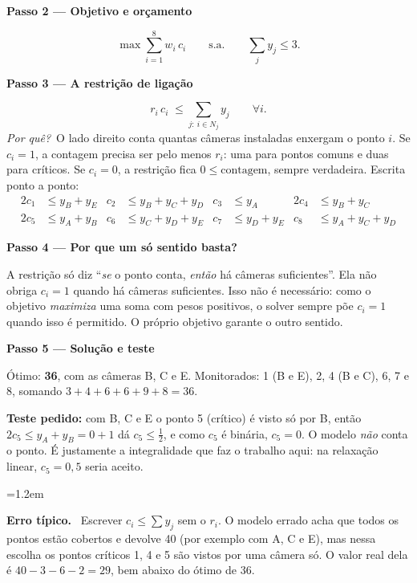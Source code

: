 \documentclass[11pt,a4paper]{article}
\newcommand{\passo}[1]{\par\medskip\textbf{#1}\par}
\newcommand{\porque}{\textit{Por quê?}\ }
\newenvironment{nota}[1]{\par\smallskip\begin{list}{}{\leftmargin=1.2em\rightmargin=0pt}\item[]\textbf{#1.}\ }{\end{list}}
\begin{document}
\passo{Passo 2 --- Objetivo e orçamento}
\[
  \max \sum_{i=1}^{8} w_i\,c_i \qquad\text{s.a.}\qquad \sum_j y_j \le 3 .
\]

\passo{Passo 3 --- A restrição de ligação}
\[
  r_i\,c_i \;\le \sum_{j:\ i\in N_j} y_j \qquad \forall i .
\]
\porque O lado direito conta quantas câmeras instaladas enxergam o ponto $i$. Se $c_i=1$, a contagem
precisa ser pelo menos $r_i$: uma para pontos comuns e duas para críticos. Se $c_i=0$, a restrição fica
$0\le\text{contagem}$, sempre verdadeira. Escrita ponto a ponto:
\begin{align*}
  2c_1 &\le y_B + y_E & c_2 &\le y_B + y_C + y_D & c_3 &\le y_A & 2c_4 &\le y_B + y_C\\
  2c_5 &\le y_A + y_B & c_6 &\le y_C + y_D + y_E & c_7 &\le y_D + y_E & c_8 &\le y_A + y_C + y_D
\end{align*}

\passo{Passo 4 --- Por que um só sentido basta?}
A restrição só diz ``\emph{se} o ponto conta, \emph{então} há câmeras suficientes''. Ela não obriga $c_i=1$ quando há
câmeras suficientes. Isso não é necessário: como o objetivo \emph{maximiza} uma soma com pesos positivos,
o solver sempre põe $c_i=1$ quando isso é permitido. O próprio objetivo garante o outro sentido.

\passo{Passo 5 --- Solução e teste}
Ótimo: \textbf{36}, com as câmeras B, C e E. Monitorados: 1 (B e E), 2, 4 (B e C), 6, 7 e 8, somando
$3+4+6+6+9+8=36$.

\textbf{Teste pedido:} com B, C e E o ponto 5 (crítico) é visto só por B, então $2c_5\le y_A+y_B=0+1$ dá
$c_5\le\frac12$, e como $c_5$ é binária, $c_5=0$. O modelo \emph{não} conta o ponto. É justamente a
integralidade que faz o trabalho aqui: na relaxação linear, $c_5=0{,}5$ seria aceito.

\begin{nota}{Erro típico}
Escrever $c_i\le\sum y_j$ sem o $r_i$. O modelo errado acha que todos os pontos estão cobertos e
devolve 40 (por exemplo com A, C e E), mas nessa escolha os pontos críticos 1, 4 e 5 são vistos por uma câmera
só. O valor real dela é $40-3-6-2=29$, bem abaixo do ótimo de 36.
\end{nota}

\end{document}
